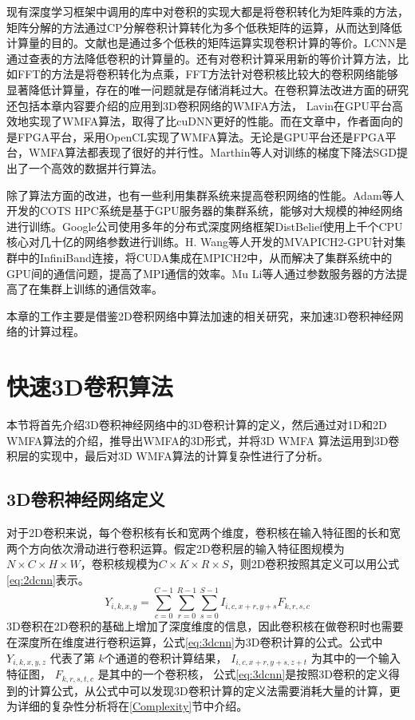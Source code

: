 现有深度学习框架中调用的库中对卷积的实现大都是将卷积转化为矩阵乘的方法，矩阵分解的方法通过CP分解卷积计算转化为多个低秩矩阵的运算，从而达到降低计算量的目的。文献也是通过多个低秩的矩阵运算实现卷积计算的等价。LCNN是通过查表的方法降低卷积的计算量的。还有对卷积计算采用新的等价计算方法，比如FFT的方法是将卷积转化为点乘，FFT方法针对卷积核比较大的卷积网络能够显著降低计算量，存在的唯一问题就是存储消耗过大。在卷积算法改进方面的研究还包括本章内容要介绍的应用到3D卷积网络的WMFA方法， Lavin在GPU平台高效地实现了WMFA算法，取得了比cuDNN更好的性能。而在文章中，作者面向的是FPGA平台，采用OpenCL实现了WMFA算法。无论是GPU平台还是FPGA平台，WMFA算法都表现了很好的并行性。Marthin等人对训练的梯度下降法SGD提出了一个高效的数据并行算法。

除了算法方面的改进，也有一些利用集群系统来提高卷积网络的性能。Adam等人开发的COTS HPC系统是基于GPU服务器的集群系统，能够对大规模的神经网络进行训练。Google公司使用多年的分布式深度网络框架DistBelief使用上千个CPU核心对几十亿的网络参数进行训练。H. Wang等人开发的MVAPICH2-GPU针对集群中的InfiniBand连接，将CUDA集成在MPICH2中，从而解决了集群系统中的GPU间的通信问题，提高了MPI通信的效率。Mu Li等人通过参数服务器的方法提高了在集群上训练的通信效率。

本章的工作主要是借鉴2D卷积网络中算法加速的相关研究，来加速3D卷积神经网络的计算过程。
\section{快速3D卷积算法}
本节将首先介绍3D卷积神经网络中的3D卷积计算的定义，然后通过对1D和2D WMFA算法的介绍，推导出WMFA的3D形式，并将3D WMFA 算法运用到3D卷积层的实现中，最后对3D WMFA算法的计算复杂性进行了分析。

\subsection{3D卷积神经网络定义}
对于2D卷积来说，每个卷积核有长和宽两个维度，卷积核在输入特征图的长和宽两个方向依次滑动进行卷积运算。假定2D卷积层的输入特征图规模为$N\times C\times H\times W$，卷积核规模为$C\times K\times R\times S$，则2D卷积按照其定义可以用公式\ref{eq:2dcnn}表示。
\begin{equation} \label{eq:2dcnn}
Y_{i,k,x,y} = \sum_{c=0}^{C-1}\sum_{r=0}^{R-1}\sum_{s=0}^{S-1}I_{i,c,x+r,y+s}F_{k,r,s,c}
\end{equation} 
3D卷积在2D卷积的基础上增加了深度维度的信息，因此卷积核在做卷积时也需要在深度所在维度进行卷积运算，公式\ref{eq:3dcnn}为3D卷积计算的公式。公式中 $Y_{i,k,x,y,z}$ 代表了第 $k$个通道的卷积计算结果， $I_{i,c,x+r,y+s,z+t}$ 为其中的一个输入特征图， $F_{k,r,s,t,c}$ 是其中的一个卷积核， 公式\ref{eq:3dcnn}是按照3D卷积的定义得到的计算公式，从公式中可以发现3D卷积计算的定义法需要消耗大量的计算，更为详细的复杂性分析将在\ref{Complexity}节中介绍。 

